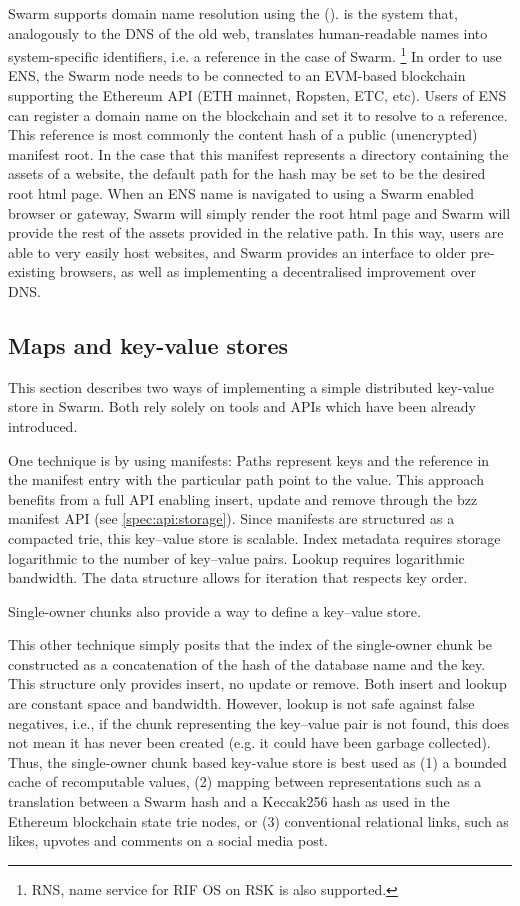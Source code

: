 Swarm supports domain name resolution using the  ().  is the system that, analogously to the DNS of the old web, translates human-readable names into system-specific identifiers, i.e. a reference in the case of Swarm.%
\footnote{RNS, name service for RIF OS on RSK is also supported.}
%
In order to use ENS, the Swarm node needs to be connected to an EVM-based blockchain supporting the Ethereum API (ETH mainnet, Ropsten, ETC, etc). 
Users of ENS can register a domain name on the blockchain and set it to resolve to a reference. This reference is most commonly the content hash of a public (unencrypted) manifest root. In the case that this manifest represents a directory containing the assets of a website, the default path for the hash may be set to be the desired root html page. When an ENS name is navigated to using a Swarm enabled browser or gateway, Swarm will simply render the root html page and Swarm will provide the rest of the assets provided in the relative path. In this way, users are able to very easily host websites, and Swarm provides an interface to older pre-existing browsers, as well as implementing a decentralised improvement over DNS.


\subsection{Maps and key-value stores\statusgreen}\label{sec:maps}

This section describes two ways of implementing a simple distributed key-value store in Swarm. Both rely solely on tools and APIs which have been already introduced.

One technique is by using manifests: Paths represent keys and the reference in the manifest entry with the particular path point to the value. This approach benefits from a full API enabling insert, update and remove through the bzz manifest API (see \ref{spec:api:storage}). Since manifests are structured as a compacted trie, this key--value store is scalable. Index metadata requires storage logarithmic to the number of key--value pairs. Lookup requires logarithmic bandwidth. The data structure allows for iteration that respects key order. 

Single-owner chunks also provide a way to define a key--value store.

This other technique simply posits that the index of the single-owner chunk be constructed as a concatenation of the hash of the database name and the key. This structure only provides insert, no update or remove. Both insert and lookup are constant space and bandwidth. However, lookup is not safe against false negatives, i.e., if the chunk representing the key--value pair is not found, this does not mean it has never been created (e.g. it could have been garbage collected). Thus, the single-owner chunk based key-value store is best used as (1) a bounded cache of recomputable values, (2) mapping between representations such as a translation between a Swarm hash and a Keccak256 hash as used in the Ethereum blockchain state trie nodes, or (3) conventional relational links, such as likes, upvotes and comments on a social media post. 


